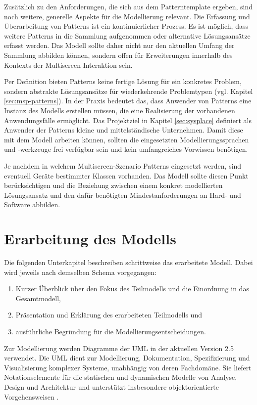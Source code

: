 Zusätzlich zu den Anforderungen, die sich aus dem Patterntemplate ergeben, sind  noch weitere, generelle Aspekte für die Modellierung relevant. Die Erfassung und Überarbeitung von Patterns ist ein kontinuierlicher Prozess. Es ist möglich, dass weitere Patterns in die Sammlung aufgenommen oder alternative Lösungsansätze erfasst werden. Das Modell sollte daher nicht nur den aktuellen Umfang der Sammlung abbilden können, sondern offen für Erweiterungen innerhalb des Kontexts der Multiscreen-Interaktion sein.

Per Definition bieten Patterns keine fertige Lösung für ein konkretes Problem, sondern abstrakte Lösungsansätze für wiederkehrende Problemtypen (vgl. Kapitel \ref{sec:msp-patterns}). In der Praxis bedeutet das, dass Anwender von Patterns eine Instanz des Modells erstellen müssen, die eine Realisierung der vorhandenen Anwendungsfälle ermöglicht. Das Projektziel in Kapitel \ref{sec:sysplace} definiert als Anwender der Patterns kleine und mittelständische Unternehmen. Damit diese mit dem Modell arbeiten können, sollten die eingesetzten Modellierungssprachen und -werkzeuge frei verfügbar sein und kein umfangreiches Vorwissen benötigen.

Je nachdem in welchem Multiscreen-Szenario Patterns eingesetzt werden, sind eventuell Geräte bestimmter Klassen vorhanden. Das Modell sollte diesen Punkt berücksichtigen und die Beziehung zwischen einem konkret modellierten Lösungsansatz und den dafür benötigten Mindestanforderungen an Hard- und Software abbilden.

\section{Erarbeitung des Modells}
Die folgenden Unterkapitel beschreiben schrittweise das erarbeitete Modell. Dabei wird jeweils nach demselben Schema vorgegangen:
\begin{enumerate}
\item Kurzer Überblick über den Fokus des Teilmodells und die Einordnung in das Gesamtmodell,
\item Präsentation und Erklärung des erarbeiteten Teilmodells und
\item ausführliche Begründung für die Modellierungsentscheidungen.
\end{enumerate}
Zur Modellierung werden Diagramme der \ac{UML} in der aktuellen Version 2.5 verwendet. Die \acs{UML} dient zur Modellierung, Dokumentation, Spezifizierung und Visualisierung komplexer Systeme, unabhängig von deren Fachdomäne. Sie liefert Notationselemente für die statischen und dynamischen Modelle von Analyse, Design und Architektur und unterstützt insbesondere ob\-jekt\-ori\-en\-tier\-te Vorgehensweisen 
\citep[4]{UML2012}.

